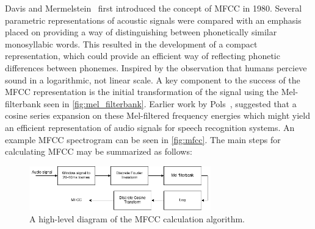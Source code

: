 \documentclass[a4paper, 12pt, twoside]{report}
\begin{document}
Davis and Mermelstein~\cite{1163420} first introduced the concept of MFCC in 1980.
Several parametric representations of acoustic signals were compared with an emphasis placed on providing a way of distinguishing between phonetically similar monosyllabic words. This resulted in the development of a compact representation, which could provide an efficient way of reflecting phonetic differences between phonemes.
Inspired by the observation that humans percieve sound in a logarithmic, not linear scale. A key component to the success of the MFCC representation is the initial transformation of the signal using the Mel-filterbank seen in \ref{fig:mel_filterbank}.
Earlier work by Pols~\cite{Pols1977SpectralAA}, suggested that a cosine series expansion on these  Mel-filtered frequency energies which might yield an efficient representation of audio signals for speech recognition systems.
An example MFCC spectrogram can be seen in \ref{fig:mfcc}. The main steps for calculating MFCC may be summarized as follows:

\begin{figure}[H]
\centering
\includegraphics[width=0.7\textwidth]{./Figures/mel_flow.png}
\caption{\label{fig:mel_flow}A high-level diagram of the MFCC calculation algorithm.}
\end{figure}
\end{document}
